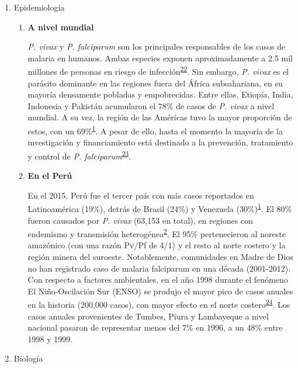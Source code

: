\documentclass[]{article}
\begin{document}
\begin{enumerate}
\def\labelenumi{\alph{enumi}.}
\item
  Epidemiología

  \begin{enumerate}
  \def\labelenumii{\roman{enumii}.}
  \item
    \textbf{A nivel mundial}

    \emph{P. vivax} y \emph{P. falciparum} son los principales
    responsables de los casos de malaria en humanos. Ambas especies
    exponen aproximadamente a 2.5 mil millones de personas en riesgo de
    infección\textsuperscript{\protect\hyperlink{ref-howes2016global}{22}}.
    Sin embargo, \emph{P. vivax} es el parásito dominante en las
    regiones fuera del África subsahariana, en su mayoría densamente
    pobladas y empobrecidas. Entre ellas, Etiopía, India, Indonesia y
    Pakistán acumularon el 78\% de casos de \emph{P. vivax} a nivel
    mundial. A su vez, la región de las Américas tuvo la mayor
    proporción de estos, con un
    69\%\textsuperscript{\protect\hyperlink{ref-WHO2016world}{1}}. A
    pesar de ello, hasta el momento la mayoría de la investigación y
    financiamiento está destinado a la prevención, tratamiento y control
    de \emph{P.
    falciparum}\textsuperscript{\protect\hyperlink{ref-path2011}{23}}.
  \item
    \textbf{En el Perú}

    En el 2015, Perú fue el tercer país con más casos reportados en
    Latinoamérica (19\%), detrás de Brasil (24\%) y Venezuela
    (30\%)\textsuperscript{\protect\hyperlink{ref-WHO2016world}{1}}. El
    80\% fueron causados por \emph{P. vivax} (63,153 en total), en
    regiones con endemismo y transmisión
    heterogénea\textsuperscript{\protect\hyperlink{ref-rosas2016peru}{2}}.
    El 95\% pertenecieron al noreste amazónico (con una razón Pv/Pf de
    4/1) y el resto al norte costero y la región minera del suroeste.
    Notablemente, comunidades en Madre de Dios no han registrado caso de
    malaria falciparum en una década (2001-2012). Con respecto a
    factores ambientales, en el año 1998 durante el fenómeno El
    Niño-Oscilación Sur (ENSO) se produjo el mayor pico de casos anuales
    en la historia (200,000 casos), con mayor efecto en el norte
    costero\textsuperscript{\protect\hyperlink{ref-gagnon2002enso}{24}}.
    Los casos anuales provenientes de Tumbes, Piura y Lambayeque a nivel
    nacional pasaron de representar menos del 7\% en 1996, a un 48\%
    entre 1998 y 1999.
  \end{enumerate}
\item
  Biología


\end{enumerate}
\end{document}
